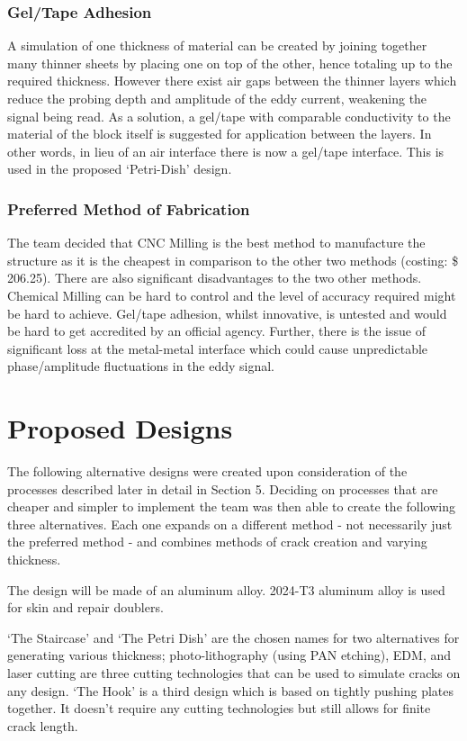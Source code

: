 \documentclass[12pt]{article}
\begin{document}
\subsubsection{Gel/Tape Adhesion}
A simulation of one thickness of material can be created by joining together many thinner sheets by placing one on top of the other, hence totaling up to the required thickness. However there exist air gaps between the thinner layers which reduce the probing depth and amplitude of the eddy current, weakening the signal being read. As a solution, a gel/tape with comparable conductivity to the material of the block itself is suggested for application between the layers. In other words, in lieu of an air interface there is now a gel/tape interface. This is used in the proposed `Petri-Dish' design.

\subsubsection{Preferred Method of Fabrication}
The team decided that CNC Milling is the best method to manufacture the structure as it is the cheapest in comparison to the other two methods (costing: \$ 206.25). There are also significant disadvantages to the two other methods. Chemical Milling can be hard to control and the level of accuracy required might be hard to achieve. Gel/tape adhesion, whilst innovative, is untested and would be hard to get accredited by an official agency. Further, there is the issue of significant loss at the metal-metal interface which could cause unpredictable phase/amplitude fluctuations in the eddy signal. 
\newpage
\section{Proposed Designs}
The following alternative designs were created upon consideration of the processes described later in detail in Section 5. Deciding on processes that are cheaper and simpler to implement the team was then able to create the following three alternatives. Each one expands on a different method - not necessarily just the preferred method - and combines methods of crack creation and varying thickness.

The design will be made of an aluminum alloy. 2024-T3 aluminum alloy is used for skin and repair doublers.

`The Staircase' and `The Petri Dish' are the chosen names for two alternatives for generating various thickness; photo-lithography (using PAN etching), EDM, and laser cutting are three cutting technologies that can be used to simulate cracks on any design. `The Hook' is a third design which is based on tightly pushing plates together. It doesn't require any cutting technologies but still allows for finite crack length. 
\end{document}

